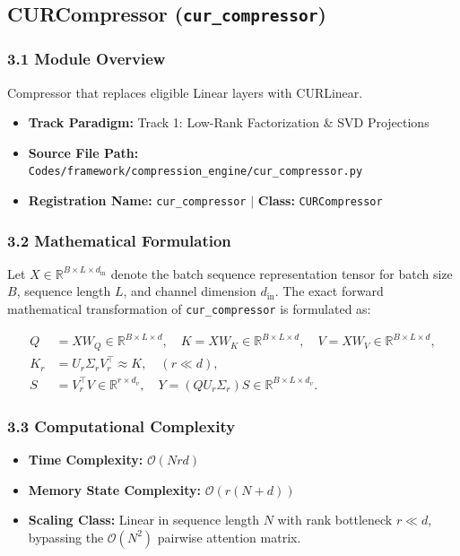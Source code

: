 \subsection{CURCompressor (\texttt{cur\_compressor})}
\label{sec:app_module_cur_compressor}

\subsubsection*{3.1 Module Overview}
Compressor that replaces eligible Linear layers with CURLinear.
\begin{itemize}
    \item \textbf{Track Paradigm:} Track 1: Low-Rank Factorization & SVD Projections
    \item \textbf{Source File Path:} \texttt{Codes/framework/compression\_engine/cur\_compressor.py}
    \item \textbf{Registration Name:} \texttt{cur\_compressor} $\mid$ \textbf{Class:} \texttt{CURCompressor}
\end{itemize}

\subsubsection*{3.2 Mathematical Formulation}
Let $X \in \mathbb{R}^{B \times L \times d_{\text{in}}}$ denote the batch sequence representation tensor for batch size $B$, sequence length $L$, and channel dimension $d_{\text{in}}$. The exact forward mathematical transformation of \texttt{cur\_compressor} is formulated as:

\begin{align}
Q &= X W_Q \in \mathbb{R}^{B \times L \times d}, \quad K = X W_K \in \mathbb{R}^{B \times L \times d}, \quad V = X W_V \in \mathbb{R}^{B \times L \times d}, \\
K_r &= U_r \Sigma_r V_r^\top \approx K, \quad (r \ll d), \\
S &= V_r^\top V \in \mathbb{R}^{r \times d_v}, \quad Y = (Q U_r \Sigma_r) S \in \mathbb{R}^{B \times L \times d_v}.
\end{align}


\subsubsection*{3.3 Computational Complexity}
\begin{itemize}
    \item \textbf{Time Complexity:} $\mathcal{O}(N r d)$
    \item \textbf{Memory State Complexity:} $\mathcal{O}(r(N + d))$
    \item \textbf{Scaling Class:} Linear in sequence length $N$ with rank bottleneck $r \ll d$, bypassing the $\mathcal{O}(N^2)$ pairwise attention matrix.
\end{itemize}

